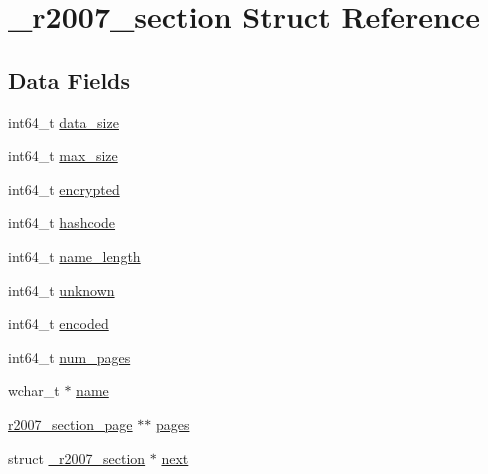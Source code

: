 \hypertarget{struct__r2007__section}{\section{\-\_\-r2007\-\_\-section \-Struct \-Reference}
\label{struct__r2007__section}
}
\subsection*{\-Data \-Fields}
\begin{DoxyCompactItemize}
\item 
int64\-\_\-t \hyperlink{struct__r2007__section_ac93db6ad2ed926362a295ecd02bd6117}{data\-\_\-size}
\item 
int64\-\_\-t \hyperlink{struct__r2007__section_ab458009c3556d01ce7701611e5ab22d1}{max\-\_\-size}
\item 
int64\-\_\-t \hyperlink{struct__r2007__section_aa7afba0e8e660c11981ef8d1bfbfaa51}{encrypted}
\item 
int64\-\_\-t \hyperlink{struct__r2007__section_afeaa8aafe94cd3a79cb7eed46ddeea88}{hashcode}
\item 
int64\-\_\-t \hyperlink{struct__r2007__section_a9babc03cd9e24a312a61579d835a06e9}{name\-\_\-length}
\item 
int64\-\_\-t \hyperlink{struct__r2007__section_aeac5c2844f6d541dbe1cfd11d905bfc5}{unknown}
\item 
int64\-\_\-t \hyperlink{struct__r2007__section_af6613bf214c3e64926a097eb239392a6}{encoded}
\item 
int64\-\_\-t \hyperlink{struct__r2007__section_aeac3a9c9cf3af6f016d44ef302fc4046}{num\-\_\-pages}
\item 
wchar\-\_\-t $\ast$ \hyperlink{struct__r2007__section_ae1b80382060a60af8783cc42982f6e5c}{name}
\item 
\hyperlink{decode__r2007_8c_afff2b6a0edc761cdcfe1828fb11a28da}{r2007\-\_\-section\-\_\-page} $\ast$$\ast$ \hyperlink{struct__r2007__section_ac79701cefc6c840ee672b42c03c22a85}{pages}
\item 
struct \hyperlink{struct__r2007__section}{\-\_\-r2007\-\_\-section} $\ast$ \hyperlink{struct__r2007__section_a8c83ac9857f883ae988c3276b6c7e543}{next}
\end{DoxyCompactItemize}


